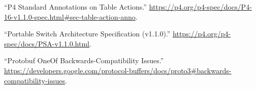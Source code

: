 \documentclass[11pt]{article}
\begin{document}
{{\begin{thebibliography}{36}
\mdbibitemlabel{{}[17]}\textquotedblleft{}P4 Standard Annotations on Table Actions.\textquotedblright{} \href{https://p4.org/p4-spec/docs/P4-16-v1.1.0-spec.html\%23sec-table-action-anno}{{\ttfamily https://\hspace{0pt}p4.\hspace{0pt}org/\hspace{0pt}p4-\hspace{0pt}spec/\hspace{0pt}docs/\hspace{0pt}P4-\hspace{0pt}16-\hspace{0pt}v1.\hspace{0pt}1.\hspace{0pt}0-\hspace{0pt}spec.\hspace{0pt}html\#\hspace{0pt}sec-\hspace{0pt}table-\hspace{0pt}action-\hspace{0pt}anno}}.\label{p4actionannotations}%

\mdbibitemlabel{{}[18]}\textquotedblleft{}Portable Switch Architecture Specification (v1.1.0).\textquotedblright{} \href{https://p4.org/p4-spec/docs/PSA-v1.1.0.html}{{\ttfamily https://\hspace{0pt}p4.\hspace{0pt}org/\hspace{0pt}p4-\hspace{0pt}spec/\hspace{0pt}docs/\hspace{0pt}PSA-\hspace{0pt}v1.\hspace{0pt}1.\hspace{0pt}0.\hspace{0pt}html}}.\label{psa}%

\mdbibitemlabel{{}[19]}\textquotedblleft{}Protobuf OneOf Backwards-Compatibility Issues.\textquotedblright{} \href{https://developers.google.com/protocol-buffers/docs/proto3\%23backwards-compatibility-issues}{{\ttfamily https://\hspace{0pt}developers.\hspace{0pt}google.\hspace{0pt}com/\hspace{0pt}protocol-\hspace{0pt}buffers/\hspace{0pt}docs/\hspace{0pt}proto3\#\hspace{0pt}backwards-\hspace{0pt}compatibility-\hspace{0pt}issues}}.\label{protooneofbackwardscompatibility}%


\end{thebibliography}}}
\end{document}
